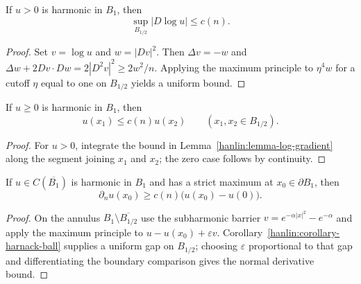 \begin{lemma}\label{hanlin:lemma-log-gradient}
If $u>0$ is harmonic in $B_1$, then
\[
\sup_{B_{1/2}}|D\log u|\le c(n).
\]
\end{lemma}
\begin{proof}
\sketch Set $v=\log u$ and $w=|Dv|^2$. Then $\Delta v=-w$ and
$\Delta w+2Dv\cdot Dw=2|D^2v|^2\ge2w^2/n$. Applying the maximum principle to
$\eta^4w$ for a cutoff $\eta$ equal to one on $B_{1/2}$ yields a uniform bound.
\end{proof}

\begin{corollary}\label{hanlin:corollary-harnack-ball}
If $u\ge0$ is harmonic in $B_1$, then
\[
u(x_1)\le c(n)u(x_2)\qquad(x_1,x_2\in B_{1/2}).
\]
\end{corollary}
\begin{proof}
\sketch For $u>0$, integrate the bound in Lemma~\ref{hanlin:lemma-log-gradient}
along the segment joining $x_1$ and $x_2$; the zero case follows by continuity.
\end{proof}

\begin{theorem}\label{hanlin:thm-hopf}
If $u\in C(\overline{B_1})$ is harmonic in $B_1$ and has a strict maximum at
$x_0\in\partial B_1$, then
\[
\partial_nu(x_0)\ge c(n)\bigl(u(x_0)-u(0)\bigr).
\]
\end{theorem}
\begin{proof}
\sketch On the annulus $B_1\setminus\overline{B_{1/2}}$ use the subharmonic
barrier $v=e^{-\alpha|x|^2}-e^{-\alpha}$ and apply the maximum principle to
$u-u(x_0)+\varepsilon v$. Corollary~\ref{hanlin:corollary-harnack-ball} supplies a
uniform gap on $B_{1/2}$; choosing $\varepsilon$ proportional to that gap and
differentiating the boundary comparison gives the normal derivative bound.
\end{proof}

